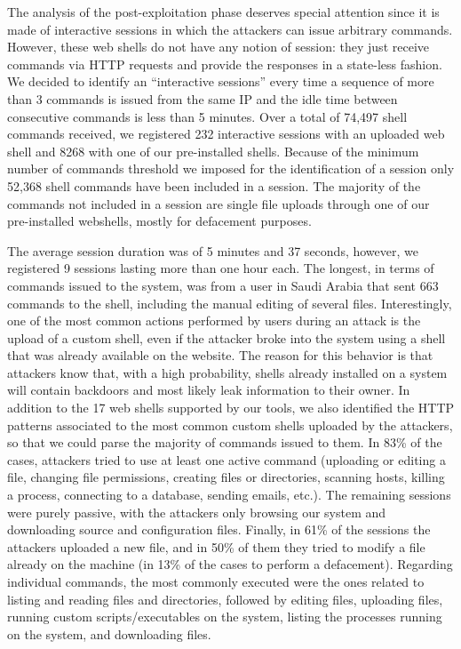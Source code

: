 The analysis of the post-exploitation phase deserves special attention since it is made of interactive sessions in which the attackers can issue arbitrary commands. However, these web shells do not have any notion of session: they just receive commands via HTTP requests and provide the responses in a state-less fashion. We decided to identify an ``interactive sessions'' every time a sequence of more than 3 commands is issued from the same IP and the idle time between consecutive commands is less than 5 minutes.
Over a total of 74,497 shell commands received, we registered 232 interactive sessions with an uploaded web shell and 8268 with one of our pre-installed shells. Because of the minimum number of commands threshold we imposed for the identification of a session only 52,368 shell commands have been included in a session. The majority of the commands not included in a session are single file uploads through one of our pre-installed webshells, mostly for defacement purposes.

The average session duration was of 5 minutes and 37 seconds, however, we registered 9 sessions lasting more than one hour each. The longest, in terms of commands issued to the system, was from a user in Saudi Arabia that sent 663 commands to the shell, including the manual editing of several files. Interestingly, one of the most common actions performed by users during an attack is the upload of a custom shell, even if the attacker broke into the system using a shell that was already available on the website. The reason for this behavior is that attackers know that, with a high probability, shells already installed on a system will contain backdoors and most likely leak information to their owner. In addition to the 17 web shells supported by our tools, we also identified the HTTP patterns associated to the most common custom shells uploaded by the attackers, so that we could parse the majority of commands issued to them.
In 83\% of the cases, attackers tried to use at least one active command (uploading or editing a file, changing file permissions, creating files or directories, scanning hosts, killing a process, connecting to a database, sending emails, etc.). The remaining sessions were purely passive, with the attackers only browsing our system and downloading source and configuration files.
Finally, in 61\% of the sessions the attackers uploaded a new file, and in 50\% of them they tried to modify a file already on the machine (in 13\% of the cases to perform a defacement). Regarding individual commands, the most commonly executed were the ones related to listing and reading files and directories, followed by editing files, uploading files, running custom scripts/executables on the system, listing the processes running on the system, and downloading files.


